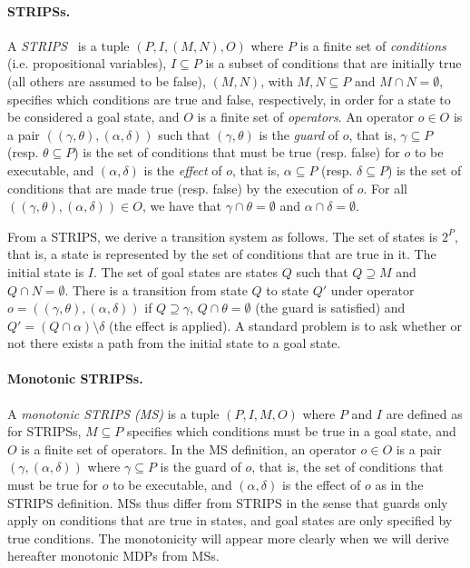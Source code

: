 \paragraph{STRIPSs.} A \textit{STRIPS}~\cite{fikes1972strips} is a tuple $(P, I, (M, N), O)$ where $P$ is a finite set of \textit{conditions} (i.e. propositional variables), $I \subseteq P$ is a subset of conditions that are initially true (all others are assumed to be false), $(M, N)$, with $M, N \subseteq P$ and $M \cap N = \emptyset$, specifies which conditions are true and false, respectively, in order for a state to be considered a goal state, and $O$ is a finite set of \textit{operators}. An operator $o \in O$ is a pair $((\gamma, \theta), (\alpha, \delta))$ such that $(\gamma, \theta)$ is the \textit{guard} of $o$, that is, $\gamma \subseteq P$ (resp. $\theta \subseteq P$) is the set of conditions that must be true (resp. false) for $o$ to be executable, and $(\alpha, \delta)$ is the \textit{effect} of $o$, that is, $\alpha \subseteq P$ (resp. $\delta \subseteq P$) is the set of conditions that are made true (resp. false) by the execution of $o$. For all $((\gamma, \theta), (\alpha, \delta)) \in O$, we have that $\gamma \cap \theta = \emptyset$ and $\alpha \cap \delta = \emptyset$.

\noindent From a STRIPS, we derive a transition system as follows. The set of states is $2^P$, that is, a state is represented by the set of conditions that are true in it. The initial state is $I$. The set of goal states are states $Q$ such that $Q  \supseteq M$ and $Q \cap N = \emptyset$. There is a transition from state $Q$ to state $Q'$ under operator $o = ((\gamma, \theta), (\alpha, \delta))$ if $Q \supseteq \gamma$, $Q \cap \theta = \emptyset$ (the guard is satisfied) and $Q' = (Q \cap \alpha) \setminus \delta$ (the effect is applied). A standard problem is to ask whether or not there exists a path from the initial state to a goal state.

\paragraph{Monotonic STRIPSs.} 
A \textit{monotonic STRIPS (MS)} is a tuple $(P, I, M, O)$ where $P$ and $I$ are defined as for STRIPSs, $M \subseteq P$ specifies which conditions must be true in a goal state, and $O$ is a finite set of operators. In the MS definition, an operator $o \in O$ is a pair $(\gamma, (\alpha, \delta))$ where $\gamma \subseteq P$ is the guard of $o$, that is, the set of conditions that must be true for $o$ to be executable, and $(\alpha, \delta)$ is the effect of $o$ as in the STRIPS definition. 
MSs thus differ from STRIPS in the sense that guards only apply on conditions that are true in states, and goal states are only specified by true conditions. The monotonicity will appear more clearly when we will derive hereafter monotonic MDPs from MSs.

